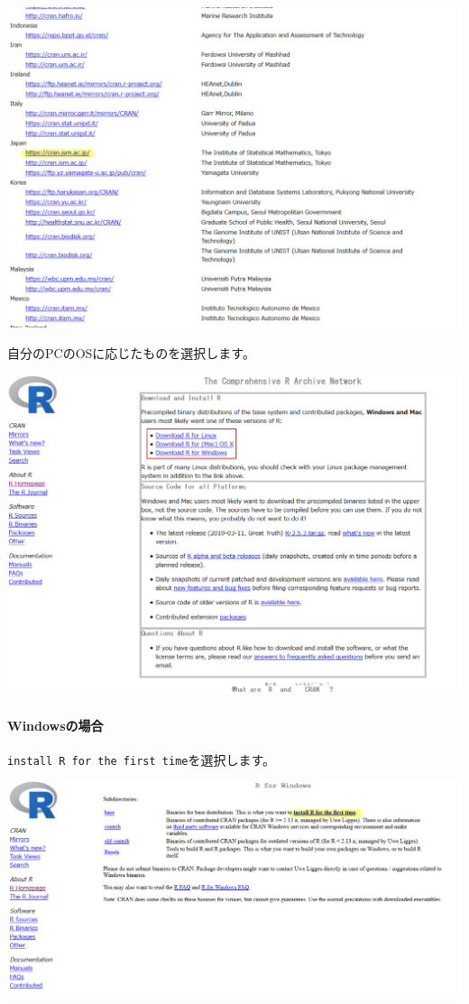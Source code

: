 \documentclass[]{bxjsreport}
\let\oldparagraph\paragraph
\renewcommand{\paragraph}[1]{\oldparagraph{#1}\mbox{}}
\begin{document}
\includegraphics{figures/R2.jpg}

自分のPCのOSに応じたものを選択します。

\includegraphics{figures/R3.jpg}

\hypertarget{windowsux306eux5834ux5408}{%
\paragraph{Windowsの場合}\label{windowsux306eux5834ux5408}}

\texttt{install\ R\ for\ the\ first\ time}を選択します。

\includegraphics{figures/R4.jpg}
\end{document}
